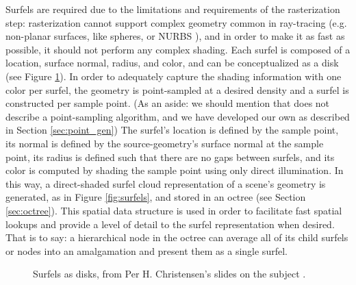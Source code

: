 Surfels are required due to the limitations and requirements of the rasterization step: rasterization cannot support complex geometry common in ray-tracing (e.g. non-planar surfaces, like spheres, or NURBS \cite{bib:nurbs}), and in order to make it as fast as possible, it should not perform any complex shading. Each surfel is composed of a location, surface normal, radius, and color, and can be conceptualized as a disk (see Figure \ref{fig:disk_surfels}). In order to adequately capture the shading information with one color per surfel, the geometry is point-sampled at a desired density and a surfel is constructed per sample point. (As an aside: we should mention that \cite{bib:christensen2008} does not describe a point-sampling algorithm, and we have developed our own as described in Section \ref{sec:point_gen}) The surfel's location is defined by the sample point, its normal is defined by the source-geometry's surface normal at the sample point, its radius is defined such that there are no gaps between surfels, and its color is computed by shading the sample point using only direct illumination. In this way, a direct-shaded surfel cloud representation of a scene's geometry is generated, as in Figure \ref{fig:surfels}, and stored in an octree (see Section \ref{sec:octree}). This spatial data structure is used in order to facilitate fast spatial lookups and provide a level of detail to the surfel representation when desired. That is to say: a hierarchical node in the octree can average all of its child surfels or nodes into an amalgamation and present them as a single surfel.

\begin{figure}
    \centering
    \caption[Surfel Disks]{Surfels as disks, from Per H. Christensen's slides on the subject \cite{bib:christensen_slides}.}
    \label{fig:disk_surfels}
\end{figure}

